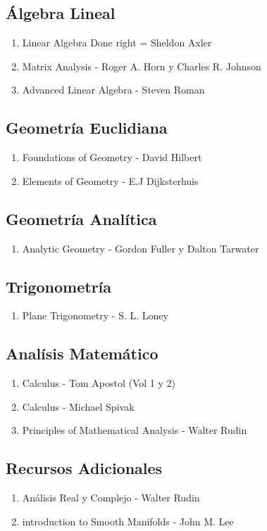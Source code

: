 \documentclass{article}
\begin{document}
\subsection{\'Algebra Lineal}
\begin{enumerate}
	\item Linear Algebra Done right = Sheldon Axler
	\item Matrix Analysis - Roger A. Horn y Charles R. Johnson
	\item Advanced Linear Algebra - Steven Roman
\end{enumerate}
\subsection{Geometr\'ia Euclidiana}
\begin{enumerate}
	\item Foundations of Geometry - David Hilbert
	\item Elements of Geometry - E.J Dijksterhuis
\end{enumerate}
\subsection{Geometr\'ia Anal\'itica}
\begin{enumerate}
	\item Analytic Geometry - Gordon Fuller y Dalton Tarwater
\end{enumerate}
\subsection{Trigonometr\'ia}
\begin{enumerate}
	\item Plane Trigonometry - S. L. Loney
\end{enumerate}
\subsection{Anal\'isis Matem\'atico}
\begin{enumerate}
	\item Calculus - Tom Apostol (Vol 1 y 2)
	\item Calculus - Michael Spivak
	\item Principles of Mathematical Analysis - Walter Rudin
\end{enumerate}
\subsection{Recursos Adicionales}
\begin{enumerate}
	\item An\'alisis Real y Complejo - Walter Rudin
	\item introduction to Smooth Manifolds - John M. Lee
\end{enumerate}
\end{document}
